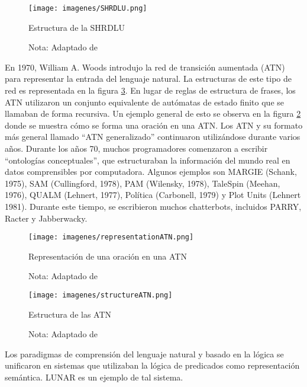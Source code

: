 \documentclass[12pt]{article}
\begin{document}
	
			\begin{figure}[H]
				\texttt{[image: imagenes/SHRDLU.png]}
				\centering
				\caption{Estructura de la SHRDLU}
				\caption*{\small Nota: Adaptado de  \cite{Schubert2020}}
				\label{fig:SHRDLU}
			\end{figure}
	
			
			En 1970, William A. Woods introdujo la red de transición aumentada (ATN) para representar la entrada del lenguaje natural. La estructuras de este tipo de red es representada en la figura \ref{fig:structureATN}. En lugar de reglas de estructura de frases, los ATN utilizaron un conjunto equivalente de autómatas de estado finito que se llamaban de forma recursiva. Un ejemplo general de esto se observa en la figura \ref{fig:representationATN} donde se muestra cómo se forma una oración en una ATN. Los ATN y su formato más general llamado ``ATN generalizado'' continuaron utilizándose durante varios años. Durante los años 70, muchos programadores comenzaron a escribir ``ontologías conceptuales'', que estructuraban la información del mundo real en datos comprensibles por computadora. Algunos ejemplos son MARGIE (Schank, 1975), SAM (Cullingford, 1978), PAM (Wilensky, 1978), TaleSpin (Meehan, 1976), QUALM (Lehnert, 1977), Política (Carbonell, 1979) y Plot Units (Lehnert 1981).  Durante este tiempo, se escribieron muchos chatterbots, incluidos PARRY, Racter y Jabberwacky.  \cite{Woods1970}
			
	
			
			\begin{figure}[h]
				\texttt{[image: imagenes/representationATN.png]}
				\centering
				\caption{Representación de una oración en una ATN}
				\caption*{\small Nota: Adaptado de  \cite{BrainKart.com2018}}
				\label{fig:representationATN}
			\end{figure}

			
			\begin{figure}[h]
				\texttt{[image: imagenes/structureATN.png]}
				\centering
				\caption{Estructura de las ATN}
				\caption*{\small Nota: Adaptado de  \cite{BrainKart.com2018}}
				\label{fig:structureATN}
			\end{figure}
			
			
			Los paradigmas de comprensión del lenguaje natural y basado en la lógica se unificaron en sistemas que utilizaban la lógica de predicados como representación semántica. LUNAR es un ejemplo de tal sistema.\cite{Kumar2011}	
			
\end{document}
